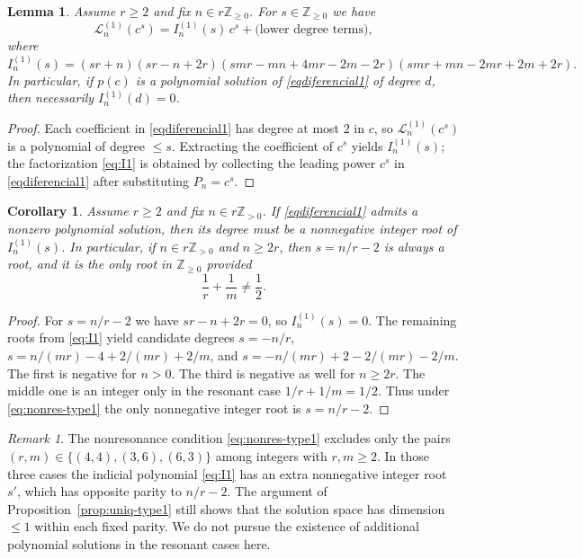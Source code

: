 \documentclass[final,nopreprintline]{elsarticle}
\newtheorem{corollary}[theorem]{Corollary}
\newtheorem{lemma}[theorem]{Lemma}
\theoremstyle{definition}
\numberwithin{equation}{section}
\theoremstyle{remark}
\newtheorem{remark}[theorem]{Remark}
\begin{document}
\begin{lemma}\label{lem:indicial-type1}
Assume $r\ge2$ and fix $n\in r\mathbb{Z}_{\ge0}$.
For $s\in\mathbb{Z}_{\ge0}$ we have
\[
\mathcal{L}^{(1)}_n(c^s)=I^{(1)}_n(s)\,c^s+\text{(lower degree terms)},
\]
where
\begin{equation}\label{eq:I1}
I^{(1)}_n(s)
=(sr+n)(sr-n+2r)(smr-mn+4mr-2m-2r)(smr+mn-2mr+2m+2r).
\end{equation}
In particular, if $p(c)$ is a polynomial solution of \eqref{eqdiferencial1} of degree $d$,
then necessarily $I^{(1)}_n(d)=0$.
\end{lemma}

\begin{proof}
Each coefficient in \eqref{eqdiferencial1} has degree at most $2$ in $c$, so
$\mathcal{L}^{(1)}_n(c^s)$ is a polynomial of degree $\le s$. Extracting the coefficient of
$c^s$ yields $I^{(1)}_n(s)$; the factorization \eqref{eq:I1} is obtained by collecting the
leading power $c^s$ in \eqref{eqdiferencial1} after substituting $P_n = c^s$.
\end{proof}

\begin{corollary}\label{cor:deg-type1}
Assume $r\ge2$ and fix $n\in r\mathbb{Z}_{>0}$. If \eqref{eqdiferencial1} admits a nonzero
polynomial solution, then its degree must be a nonnegative integer root of $I^{(1)}_n(s)$.
In particular, if $n\in r\mathbb{Z}_{>0}$ and $n\ge2r$, then $s=n/r-2$ is always a root,
and it is the \emph{only} root in $\mathbb{Z}_{\ge0}$ provided
\begin{equation}\label{eq:nonres-type1}
\frac1r+\frac1m\neq\frac12.
\end{equation}
\end{corollary}

\begin{proof}
For $s=n/r-2$ we have $sr-n+2r = 0$, so $I^{(1)}_n(s)=0$.
The remaining roots from \eqref{eq:I1} yield candidate degrees
$s=-n/r$, $s=n/(mr)-4+2/(mr)+2/m$, and $s=-n/(mr)+2-2/(mr)-2/m$.
The first is negative for $n>0$. The third is negative as well for $n\ge 2r$.
The middle one is an integer only in the resonant case $1/r+1/m=1/2$.
Thus under \eqref{eq:nonres-type1} the only nonnegative integer root is $s=n/r-2$.
\end{proof}

\begin{remark}\label{rem:resonance}
The nonresonance condition \eqref{eq:nonres-type1} excludes only the pairs
$(r,m)\in\{(4,4),(3,6),(6,3)\}$ among integers with $r,m\ge2$. In those three cases the
indicial polynomial \eqref{eq:I1} has an extra nonnegative integer root $s'$, which has
opposite parity to $n/r-2$. The argument of Proposition~\ref{prop:uniq-type1} still shows
that the solution space has dimension $\le1$ within each fixed parity. We do not pursue
the existence of additional polynomial solutions in the resonant cases here.
\end{remark}
\end{document}
